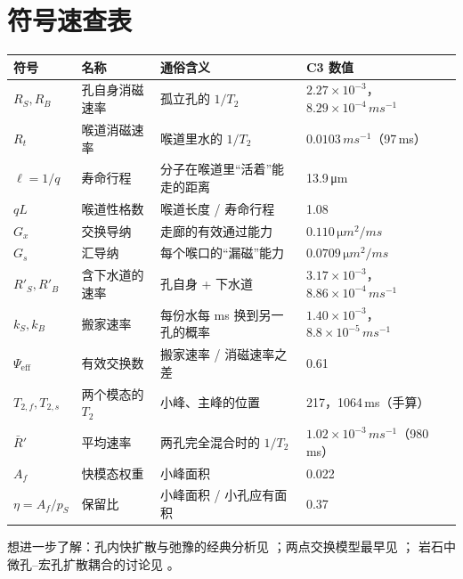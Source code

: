 \documentclass[11pt,a4paper]{article}
\newcommand{\Peff}{\Psi_{\mathrm{eff}}}
\newcommand{\um}{\,\si{\micro m}}
\newcommand{\ms}{\,\si{ms}}
\newcommand{\pms}{\,\si{ms^{-1}}}
\begin{document}
\section{符号速查表}

\begin{table}[H]
\centering\footnotesize\renewcommand{\arraystretch}{0.95}
\begin{tabular}{@{}l l p{6.2cm} l@{}}
\toprule
符号 & 名称 & 通俗含义 & C3 数值 \\
\midrule
$R_S,R_B$ & 孔自身消磁速率 & 孤立孔的 $1/T_2$ & $2.27\times10^{-3}$，$8.29\times10^{-4}\pms$ \\
$R_t$ & 喉道消磁速率 & 喉道里水的 $1/T_2$ & $0.0103\pms$（97\ms） \\
$\ell=1/q$ & 寿命行程 & 分子在喉道里“活着”能走的距离 & 13.9\um \\
$qL$ & 喉道性格数 & 喉道长度 / 寿命行程 & 1.08 \\
$G_x$ & 交换导纳 & 走廊的有效通过能力 & $0.110\,\si{\micro m^2/ms}$ \\
$G_s$ & 汇导纳 & 每个喉口的“漏磁”能力 & $0.0709\,\si{\micro m^2/ms}$ \\
$R'_S,R'_B$ & 含下水道的速率 & 孔自身 + 下水道 & $3.17\times10^{-3}$，$8.86\times10^{-4}\pms$ \\
$k_S,k_B$ & 搬家速率 & 每份水每 ms 换到另一孔的概率 & $1.40\times10^{-3}$，$8.8\times10^{-5}\pms$ \\
$\Peff$ & 有效交换数 & 搬家速率 / 消磁速率之差 & 0.61 \\
$T_{2,f},T_{2,s}$ & 两个模态的 $T_2$ & 小峰、主峰的位置 & 217，1064\ms（手算） \\
$\bar R'$ & 平均速率 & 两孔完全混合时的 $1/T_2$ & $1.02\times10^{-3}\pms$（980\ms） \\
$A_f$ & 快模态权重 & 小峰面积 & 0.022 \\
$\eta=A_f/p_S$ & 保留比 & 小峰面积 / 小孔应有面积 & 0.37 \\
\bottomrule
\end{tabular}
\end{table}

\noindent 想进一步了解：孔内快扩散与弛豫的经典分析见 \citet{BrownsteinTarr1979}；两点交换模型最早见 \citet{ZimmermanBrittin1957}；
岩石中微孔–宏孔扩散耦合的讨论见 \citet{AnandHirasaki2007}。
\end{document}
